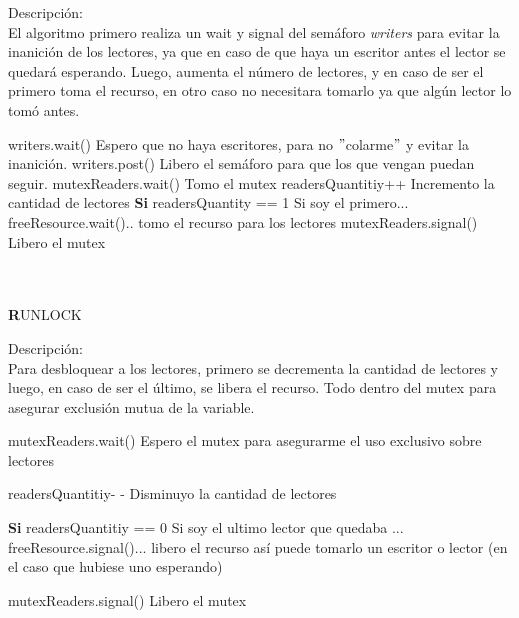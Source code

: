 Descripción:\\
El algoritmo primero realiza un wait y signal del semáforo \textit{writers} para evitar la inanición de los lectores, ya que en caso de que haya un escritor antes el lector se quedará esperando.
Luego, aumenta el número de lectores, y en caso de ser el primero toma el recurso, en otro caso no necesitara tomarlo ya que algún lector lo tomó antes. 
\begin{codebox}
\li	writers.wait()			\RComment Espero que no haya escritores, para no $"$colarme$"$ y evitar la inanición.
\li	writers.post()			\RComment Libero el semáforo para que los que vengan puedan seguir.
\li	mutexReaders.wait()		\RComment Tomo el mutex
\li	readersQuantitiy++		\RComment Incremento la cantidad de lectores
\li	\textbf{Si} readersQuantity == 1 \Do	\RComment Si soy el primero... 
\li		freeResource.wait()\End	\RComment .. tomo el recurso para los lectores
\li	mutexReaders.signal()		\RComment Libero el mutex
\end{codebox}
\mbox{}\\\mbox{}\\
\textbf RUNLOCK

Descripción:\\
Para desbloquear a los lectores, primero se decrementa la cantidad de lectores y luego, en caso de ser el último, se libera el recurso. Todo dentro del mutex para asegurar exclusión mutua de la variable.
\begin{codebox}

\li	mutexReaders.wait() \RComment Espero el mutex para asegurarme el uso exclusivo sobre lectores

\li	readersQuantitiy- - \RComment Disminuyo la cantidad de lectores

\li	\textbf{Si} readersQuantitiy == 0 \Do \RComment Si soy el ultimo lector que quedaba ... 
\li	freeResource.signal()\End  \RComment ... libero el recurso así puede tomarlo un escritor o lector (en el caso que hubiese uno esperando)

\li	mutexReaders.signal() \RComment Libero el mutex
\end{codebox}
